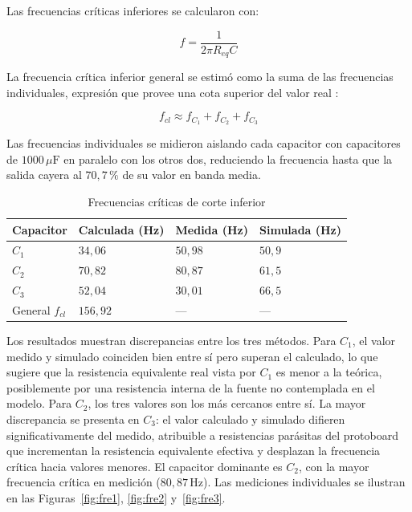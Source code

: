 \documentclass[journal]{IEEEtran}
\begin{document}
Las frecuencias cr\'iticas inferiores se calcularon con:

\begin{equation}
    f = \frac{1}{2\pi R_{eq} C}
    \label{eq:fc}
\end{equation}

La frecuencia cr\'itica inferior general se estim\'o como la suma de las frecuencias individuales, expresi\'on que provee una cota superior del valor real \cite{Floyd2008}:

\begin{equation}
    f_{cl} \approx f_{C_1} + f_{C_2} + f_{C_3}
    \label{eq:fcl}
\end{equation}

Las frecuencias individuales se midieron aislando cada capacitor con capacitores de $1000\,\mu\text{F}$ en paralelo con los otros dos, reduciendo la frecuencia hasta que la salida cayera al $70{,}7\,\%$ de su valor en banda media.

\begin{table}[!ht]
    \centering
    \caption{Frecuencias cr\'iticas de corte inferior}
    \begin{tabular}{|>{\centering\arraybackslash}m{1.4cm}|
                     >{\centering\arraybackslash}m{1.7cm}|
                     >{\centering\arraybackslash}m{1.7cm}|
                     >{\centering\arraybackslash}m{1.5cm}|}
        \hline
        Capacitor & Calculada (Hz) & Medida (Hz) & Simulada (Hz) \\
        \hline
        $C_1$            & $34{,}06$ & $50{,}98$ & $50{,}9$  \\
        \hline
        $C_2$            & $70{,}82$ & $80{,}87$ & $61{,}5$  \\
        \hline
        $C_3$            & $52{,}04$ & $30{,}01$ & $66{,}5$  \\
        \hline
        General $f_{cl}$ & $156{,}92$ & --- & --- \\
        \hline
    \end{tabular}
    \label{tab:fc_inf}
\end{table}

Los resultados muestran discrepancias entre los tres m\'etodos. Para $C_1$, el valor medido y simulado coinciden bien entre s\'i pero superan el calculado, lo que sugiere que la resistencia equivalente real vista por $C_1$ es menor a la te\'orica, posiblemente por una resistencia interna de la fuente no contemplada en el modelo. Para $C_2$, los tres valores son los m\'as cercanos entre s\'i. La mayor discrepancia se presenta en $C_3$: el valor calculado y simulado difieren significativamente del medido, atribuible a resistencias par\'asitas del protoboard que incrementan la resistencia equivalente efectiva y desplazan la frecuencia cr\'itica hacia valores menores. El capacitor dominante es $C_2$, con la mayor frecuencia cr\'itica en medici\'on ($80{,}87\,\text{Hz}$). Las mediciones individuales se ilustran en las Figuras~\ref{fig:fre1}, \ref{fig:fre2} y~\ref{fig:fre3}.
\end{document}
